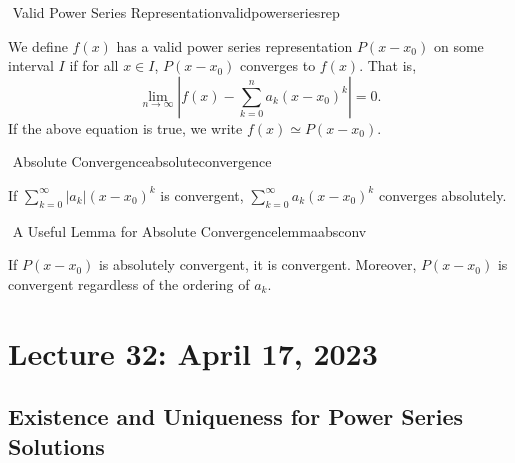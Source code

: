         \begin{definition}{\Stop\,\,Valid Power Series Representation}{validpowerseriesrep}
            
            We define \(f(x)\) has a valid power series representation \(P(x-x_0)\) on some interval \(I\) if for all \(x\in I\), \(P(x-x_0)\) converges to \(f(x)\). That is,
            \begin{equation*}
                \lim_{n\to\infty}\left|f(x)-\sum_{k=0}^n a_k(x-x_0)^k\right|=0.
            \end{equation*}
            If the above equation is true, we write \(f(x)\simeq P(x-x_0)\).

        \end{definition}
        \begin{definition}{\Stop\,\,Absolute Convergence}{absoluteconvergence}
            
            If \(\sum_{k=0}^\infty |a_k|(x-x_0)^k\) is convergent, \(\sum_{k=0}^\infty a_k(x-x_0)^k\) converges absolutely.

        \end{definition}
        \begin{theorem}{\Stop\,\,A Useful Lemma for Absolute Convergence}{lemmaabsconv}

            If \(P(x-x_0)\) is absolutely convergent, it is convergent. Moreover, \(P(x-x_0)\) is convergent regardless of the ordering of \(a_k\).
            
        \end{theorem}
        
\section{Lecture 32: April 17, 2023}

    \subsection{Existence and Uniqueness for Power Series Solutions}

